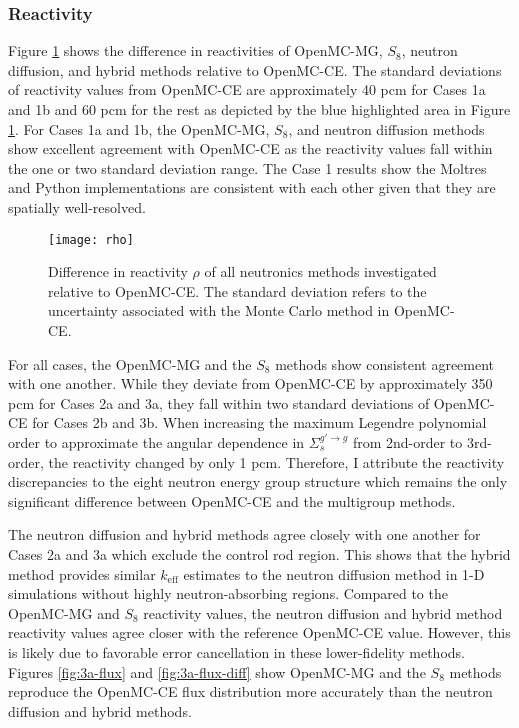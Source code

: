 \subsubsection{Reactivity}

Figure \ref{fig:1d-rho} shows the difference in reactivities of OpenMC-MG, $S_8$,
neutron diffusion, and hybrid methods relative to OpenMC-CE. The standard deviations of
reactivity values from OpenMC-CE are approximately 40 pcm for Cases 1a and 1b and 60 pcm for the
rest as depicted by the blue highlighted area in Figure \ref{fig:1d-rho}. For Cases 1a and 1b, the
OpenMC-MG, $S_8$, and neutron diffusion methods show excellent agreement with OpenMC-CE as the
reactivity values fall within the one or two standard deviation range. The Case 1 results show
the Moltres and Python implementations are consistent with each other given that they are spatially
well-resolved.

\begin{figure}[htb!]
  \centering
  \texttt{[image: rho]}
  \caption{Difference in reactivity $\rho$ of all neutronics methods investigated relative
  to OpenMC-CE. The standard deviation refers to the uncertainty associated with the Monte Carlo
  method in OpenMC-CE.}
  \label{fig:1d-rho}
\end{figure}

For all cases, the OpenMC-MG and the $S_8$ methods show consistent agreement with one another. 
While they deviate from OpenMC-CE by approximately 350 pcm for Cases 2a and 3a, they fall within
two standard deviations of OpenMC-CE for Cases 2b and 3b. When increasing the maximum Legendre
polynomial order to approximate the angular dependence in $\Sigma_s^{g'\rightarrow g}$ from
2nd-order to 3rd-order, the reactivity changed by only 1 pcm. Therefore, I attribute the reactivity
discrepancies to the eight neutron energy group structure which remains the
only significant difference between OpenMC-CE and the multigroup methods.

The neutron diffusion and hybrid methods agree closely with one another for Cases 2a and 3a which
exclude the control rod region. This shows that the hybrid method provides similar $k_\text{eff}$
estimates to the neutron diffusion method in 1-D simulations without highly neutron-absorbing
regions. Compared to the OpenMC-MG and $S_8$ reactivity values, the neutron diffusion and hybrid
method reactivity values agree closer with the reference OpenMC-CE value. However, this is likely
due to favorable error cancellation in these lower-fidelity methods. Figures \ref{fig:3a-flux} and
\ref{fig:3a-flux-diff} show OpenMC-MG and the $S_8$ methods reproduce
the OpenMC-CE flux distribution more accurately than the neutron diffusion and hybrid methods.

